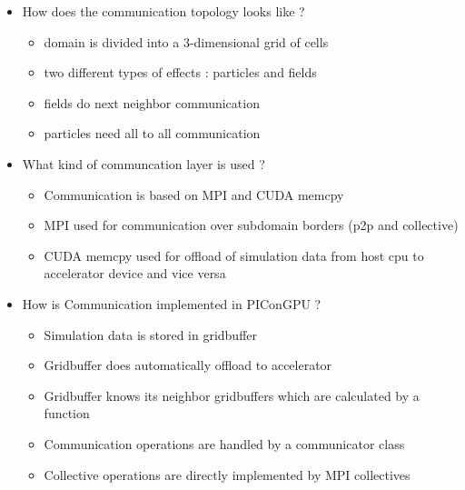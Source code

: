 \begin{itemize}
\item How does the communication topology looks like ?
  \begin{itemize}
  \item domain is divided into a 3-dimensional grid of cells
  \item two different types of effects : particles and fields
  \item fields do next neighbor communication 
  \item particles need all to all communication
  \end{itemize}

  \item What kind of communcation layer is used ?
    \begin{itemize}
      \item Communication is based on MPI and CUDA memcpy
      \item MPI used for communication over subdomain borders (p2p and collective)
      \item CUDA memcpy used for offload of simulation data from 
        host cpu to accelerator device and vice versa
    \end{itemize}

  \item How is Communication implemented in PIConGPU ?
    \begin{itemize}
      \item Simulation data is stored in gridbuffer
      \item Gridbuffer does automatically offload to accelerator
      \item Gridbuffer knows its neighbor gridbuffers which
        are calculated by a function
      \item Communication operations are handled by a communicator class
      \item Collective operations are directly implemented by
        MPI collectives
    \end{itemize}

\end{itemize}


